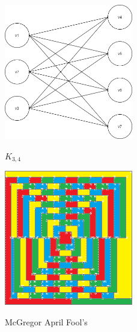 \documentclass{article}
\begin{document}
\begin{enumerate}
\begin{figure}
\caption{$K_{3, 4}$}
\centering
\includegraphics[width=0.5\textwidth]{Graph3}
\label{Graph3}
\end{figure}

\begin{figure}
\caption{McGregor April Fool's}
\centering
\includegraphics[width=0.5\textwidth]{bonus}
\label{bonus}
\end{figure}

\end{enumerate}
\end{document}
